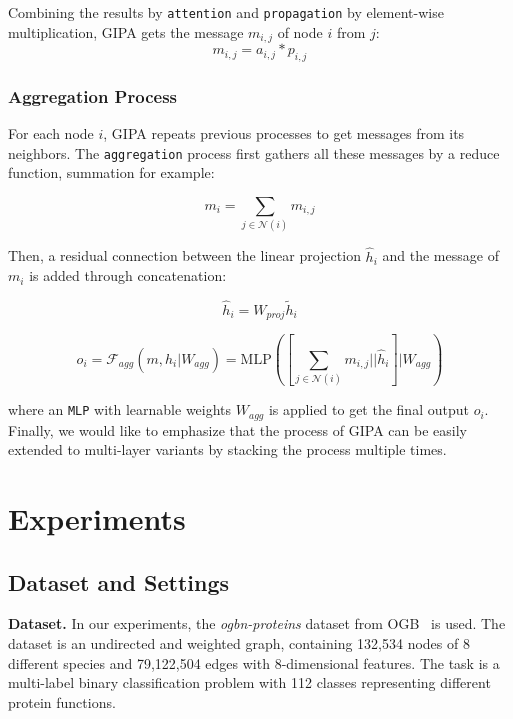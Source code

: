 \documentclass[sigconf]{acmart}
\newcommand{\model}{GIPA\xspace}
\begin{document}
Combining the results by \texttt{attention} and \texttt{propagation} by element-wise multiplication, \model gets the message $m_{i, j}$ of node $i$ from $j$:
\begin{equation}
\label{eq:msg}
m_{i, j} = a_{i, j} * p_{i, j}
\end{equation}

\subsubsection{Aggregation Process}

For each node $i$, \model repeats previous processes to get messages from its neighbors. The \texttt{aggregation} process first gathers all these messages by a reduce function, summation for example:

\begin{equation}
\label{eq:sum}
m_{i} = \sum_{j\in\mathcal{N}(i)}m_{i, j}
\end{equation}

\noindent Then, a residual connection between the linear projection $\hat{h}_i$ and the message of $m_i$ is added through concatenation: 

\begin{equation}
\label{eq:proj}
\hat{h}_i=W_{proj}\tilde{h}_i
\end{equation}

\begin{equation}
\label{eq:agg}
o_{i} = \mathcal{F}_{agg}(m, \hat{h}_i | W_{agg}) = \text{MLP}([\sum_{j\in\mathcal{N}(i)}m_{i, j} || \hat{h}_i]|W_{agg})
\end{equation}

\noindent where an \texttt{MLP} with learnable weights $W_{agg}$ is applied to get the final output $o_{i}$. 
Finally, we would like to emphasize that the process of \model can be easily extended to multi-layer variants by stacking the process multiple times. 
\section{Experiments}
\label{sec:exp}
\subsection{Dataset and Settings}

\textbf{Dataset.} In our experiments, the \textit{ogbn-proteins} dataset from OGB~\cite{hu2020open} is used. The dataset is an undirected and weighted graph, containing 132,534 nodes of 8 different species and 79,122,504 edges with 8-dimensional features. The task is a multi-label binary classification problem with 112 classes representing different protein functions. 
\end{document}
